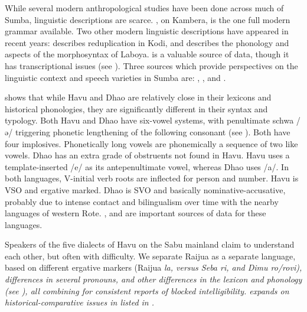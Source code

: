 While several modern anthropological studies have been done across
much of Sumba, linguistic descriptions are scarce.
\citet{Klamer1998a}, on Kambera, is the one full modern grammar available.
Two other modern linguistic descriptions have appeared in recent
years: \citet{GhanggoAte2018} describes reduplication in Kodi,
and \citet{Verdizade2019a} describes the phonology
and aspects of the morphosyntax of Laboya.
\citet{Onvlee1984} is a valuable source of data,
though it has transcriptional issues (see ).
Three sources which provide perspectives on the linguistic context
and speech varieties in Sumba are: \citet{Asplund2010},
\citet{GhanggoAte2020}, and \citet{Lovestrand2021}.

\citet{Grimes2010a} shows that while Havu
and Dhao are relatively close in their lexicons
and historical phonologies, they are significantly different
in their syntax and typology.
Both Havu and Dhao have six-vowel systems,
with penultimate schwa /ə/ triggering phonetic lengthening of
the following consonant (see ).
Both have four implosives.
Phonetically long vowels are phonemically a sequence of two like vowels.
Dhao has an extra grade of obstruents not found in Havu.
Havu uses a template-inserted /e/ as its antepenultimate vowel,
whereas Dhao uses /a/.
In both languages, V-initial verb roots are inflected for person and number.
Havu is VSO and ergative marked.
Dhao is SVO and basically nominative-accusative, probably due
to intense contact and bilingualism over time with the nearby languages of western Rote.
\citet{WalkerA1982,Grimes2008,GrimesRanohAplugi2008}, and
\citet{Balukh2020} are important sources of data for these languages.

Speakers of the five dialects of Havu on the Sabu mainland claim
to understand each other,
but often with difficulty.
We separate Raijua as a separate language,
based on different ergative markers (Raijua \it{la},
versus Seba \it{ri}, and Dimu \it{ro/rovi}),
differences in several pronouns,
and other differences in the lexicon and phonology (see \citealp{Grimes2010a}),
all combining for consistent reports of blocked intelligibility.
\citet{Blust2012a} expands on historical-comparative issues in
 listed in \citet{Grimes2010a}.
